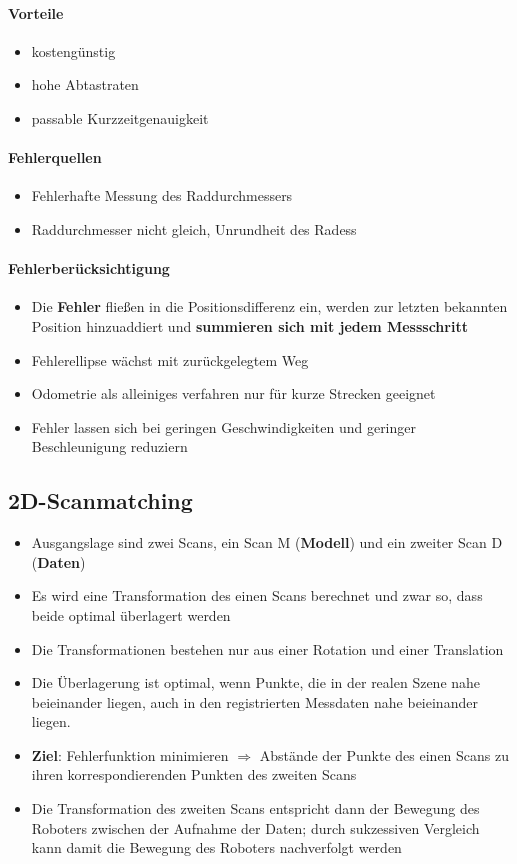 \paragraph{Vorteile}
\begin{itemize}
	\item kostengünstig
	\item hohe Abtastraten
	\item passable Kurzzeitgenauigkeit
\end{itemize}
\paragraph{Fehlerquellen}
\begin{itemize}
	\item Fehlerhafte Messung des Raddurchmessers
	\item Raddurchmesser nicht gleich, Unrundheit des Radess
\end{itemize}
\paragraph{Fehlerberücksichtigung}
\begin{itemize}
	\item Die \textbf{Fehler} fließen in die Positionsdifferenz ein, werden zur letzten bekannten Position hinzuaddiert und \textbf{summieren sich mit jedem Messschritt}
	\item Fehlerellipse wächst mit zurückgelegtem Weg
	\item Odometrie als alleiniges verfahren nur für kurze Strecken geeignet
	\item Fehler lassen sich bei geringen Geschwindigkeiten und geringer Beschleunigung reduziern
\end{itemize}
\subsection{2D-Scanmatching}
\begin{itemize}
	\item Ausgangslage sind zwei Scans, ein Scan M (\textbf{Modell}) und ein zweiter Scan D (\textbf{Daten})
	\item Es wird eine Transformation des einen Scans berechnet und zwar so, dass beide optimal überlagert werden
	\item Die Transformationen bestehen nur aus einer Rotation und einer Translation
	\item Die Überlagerung ist optimal, wenn Punkte, die in der realen Szene nahe beieinander liegen, auch in den registrierten Messdaten nahe beieinander liegen.
	\item \textbf{Ziel}: Fehlerfunktion minimieren $\Rightarrow$ Abstände der Punkte des einen Scans zu ihren korrespondierenden Punkten des zweiten Scans
	\item Die Transformation des zweiten Scans entspricht dann der Bewegung des Roboters zwischen der Aufnahme der Daten; durch sukzessiven Vergleich kann damit die Bewegung des Roboters nachverfolgt werden
\end{itemize}
